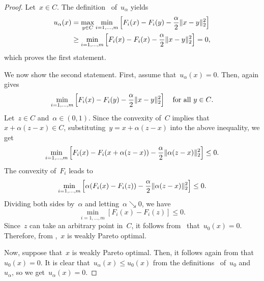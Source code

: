 \documentclass[../../main]{subfiles}
\begin{document}
\begin{proof}
    Let~$x \in C$.
    The definition~ of~$u_\alpha$ yields
    \begin{equation}
        \begin{split}
            u_\alpha(x) &= \max_{y \in C} \min_{i = 1, \dots, m} \left[ F_i(x) - F_i(y) - \frac{\alpha}{2} \lVert x - y\rVert_2^2 \right] \\
                      &\ge \min_{i = 1, \dots, m} \left[ F_i(x) - F_i(x) - \frac{\alpha}{2} \lVert x - y\rVert_2^2 \right] = 0
        ,\end{split}
    \end{equation} 
    which proves the first statement.

    We now show the second statement.
    First, assume that~$u_\alpha(x) = 0$.
    Then,  again gives
    \begin{equation}
        \min_{i = 1, \dots, m} \left[ F_i(x) - F_i(y) - \frac{\alpha}{2} \lVert x - y\rVert_2^2 \right] \quad \text{for all~$y \in C$}
    .\end{equation} 
    Let~$z \in C$ and~$\alpha \in (0, 1)$.
    Since the convexity of~$C$ implies that~$x + \alpha (z - x) \in C$, substituting~$y = x + \alpha (z - x)$ into the above inequality, we get
    \begin{equation}
        \min_{i = 1, \dots, m} \left[ F_i(x) - F_i(x + \alpha(z - x)) - \frac{\alpha}{2} \lVert\alpha (z - x)\rVert_2^2 \right] \le 0
    .\end{equation} 
    The convexity of~$F_i$ leads to
    \begin{equation}
        \min_{i = 1, \dots, m} \left[ \alpha (F_i(x) - F_i(z)) - \frac{\alpha}{2} \lVert\alpha (z - x)\rVert_2^2 \right] \le 0
    .\end{equation} 
    Dividing both sides by~$\alpha$ and letting~$\alpha \searrow 0$, we have
    \begin{equation}
        \min_{i = 1, \dots, m} [ F_i(x) - F_i(z) ] \le 0
    .\end{equation} 
    Since~$z$ can take an arbitrary point in~$C$, it follows from~ that~$u_0(x) = 0$.
    Therefore, from ,~$x$ is weakly Pareto optimal.

    Now, suppose that~$x$ is weakly Pareto optimal.
    Then, it follows again from  that~$u_0(x) = 0$.
    It is clear that~$u_\alpha(x) \le u_0(x)$ from the definitions~ of~$u_0$ and~$u_\alpha$, so we get~$u_\alpha(x) = 0$.
\end{proof}
\end{document}

